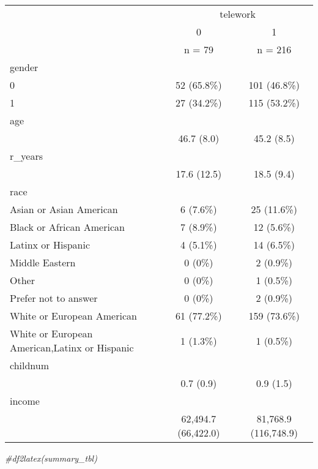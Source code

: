 \documentclass[
]{article}
\newenvironment{Shaded}{\begin{snugshade}}{\end{snugshade}}
\newcommand{\CommentTok}[1]{\textcolor[rgb]{0.56,0.35,0.01}{\textit{#1}}}
\begin{document}
\begin{table}[ ht ] 
\centering 
\caption{}\label{}
\begin{tabular}{ l c c }
\toprule
 &   \multicolumn{ 2 }{c}{ telework }\\ 
  & 0 & 1 \\ 
 & n = 79 & n = 216 \\ 
 \midrule
gender &   &  \\ 
\hspace{6pt}    0 & 52 (65.8\%) & 101 (46.8\%)\\ 
\hspace{6pt}    1 & 27 (34.2\%) & 115 (53.2\%)\\ 
age &   &  \\ 
\hspace{6pt}   & 46.7 (8.0) & 45.2 (8.5)\\ 
r\_years &   &  \\ 
\hspace{6pt}   & 17.6 (12.5) & 18.5 (9.4)\\ 
race &   &  \\ 
\hspace{6pt}    Asian or Asian American & 6 (7.6\%) & 25 (11.6\%)\\ 
\hspace{6pt}    Black or African American & 7 (8.9\%) & 12 (5.6\%)\\ 
\hspace{6pt}    Latinx or Hispanic & 4 (5.1\%) & 14 (6.5\%)\\ 
\hspace{6pt}    Middle Eastern & 0 (0\%) & 2 (0.9\%)\\ 
\hspace{6pt}    Other & 0 (0\%) & 1 (0.5\%)\\ 
\hspace{6pt}    Prefer not to answer & 0 (0\%) & 2 (0.9\%)\\ 
\hspace{6pt}    White or European American & 61 (77.2\%) & 159 (73.6\%)\\ 
\hspace{6pt}    White or European American,Latinx or Hispanic & 1 (1.3\%) & 1 (0.5\%)\\ 
childnum &   &  \\ 
\hspace{6pt}   & 0.7 (0.9) & 0.9 (1.5)\\ 
income &   &  \\ 
\hspace{6pt}   & 62,494.7 (66,422.0) & 81,768.9 (116,748.9)\\ 
\bottomrule

\end{tabular}
\end{table}

\begin{Shaded}
\begin{Highlighting}[]
\CommentTok{\#df2latex(summary\_tbl)}
\end{Highlighting}
\end{Shaded}
\end{document}
